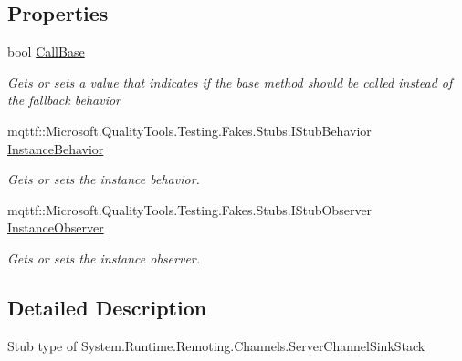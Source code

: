 \subsection*{Properties}
\begin{DoxyCompactItemize}
\item 
bool \hyperlink{class_system_1_1_runtime_1_1_remoting_1_1_channels_1_1_fakes_1_1_stub_server_channel_sink_stack_a478feb4a5467904d918a057a94a5c459}{Call\-Base}
\begin{DoxyCompactList}\small\item\em Gets or sets a value that indicates if the base method should be called instead of the fallback behavior\end{DoxyCompactList}\item 
mqttf\-::\-Microsoft.\-Quality\-Tools.\-Testing.\-Fakes.\-Stubs.\-I\-Stub\-Behavior \hyperlink{class_system_1_1_runtime_1_1_remoting_1_1_channels_1_1_fakes_1_1_stub_server_channel_sink_stack_a1d796a7a3c360e5afc51a1efece9b5e9}{Instance\-Behavior}
\begin{DoxyCompactList}\small\item\em Gets or sets the instance behavior.\end{DoxyCompactList}\item 
mqttf\-::\-Microsoft.\-Quality\-Tools.\-Testing.\-Fakes.\-Stubs.\-I\-Stub\-Observer \hyperlink{class_system_1_1_runtime_1_1_remoting_1_1_channels_1_1_fakes_1_1_stub_server_channel_sink_stack_ac8daf6ccf0977187c3930797b72fc1a9}{Instance\-Observer}
\begin{DoxyCompactList}\small\item\em Gets or sets the instance observer.\end{DoxyCompactList}\end{DoxyCompactItemize}


\subsection{Detailed Description}
Stub type of System.\-Runtime.\-Remoting.\-Channels.\-Server\-Channel\-Sink\-Stack



